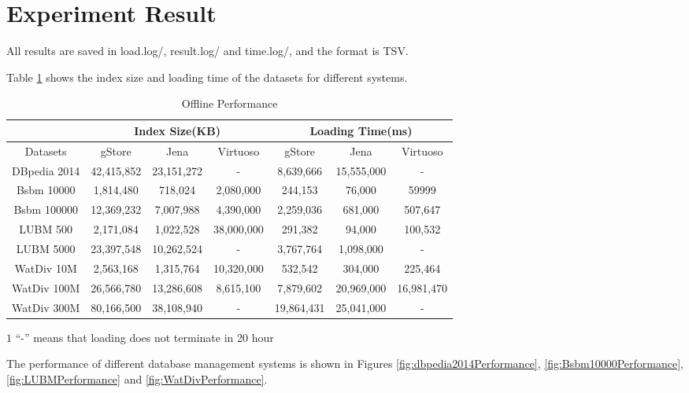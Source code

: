 \documentclass[titlepage, a4paper, 12pt] {article}
\begin{document}
\clearpage

\section{Experiment Result}

All results are saved in load.log/, result.log/ and time.log/, and the format is TSV. 

Table \ref{table:loading} shows the index size and loading time of the datasets
for different systems.

\begin{table}[htcp]
	\small
	\begin{threeparttable}
		\begin{tabular}{|c||c|c|c||c|c|c|}
			\hline
			& \multicolumn{3}{c||}{Index Size(KB)}& \multicolumn{3}{c|}{Loading Time(ms)}\\
			\hline
			\hline
			Datasets & gStore & Jena& Virtuoso& gStore & Jena& Virtuoso\\
			\hline
			DBpedia 2014 & 42,415,852&	23,151,272 &	-\tnote{$1$} & 8,639,666	&15,555,000	& -	\\
			\hline
			Bsbm 10000 & 1,814,480 & 718,024 & 2,080,000 & 244,153 & 76,000 & 59999  \\
			\hline
			Bsbm 100000 & 12,369,232 & 7,007,988 & 4,390,000 & 2,259,036 & 681,000 & 507,647 \\
			\hline
			LUBM 500  &2,171,084 &1,022,528	&	38,000,000 &	291,382&	94,000 &100,532	 \\
			\hline
			LUBM 5000 & 23,397,548&	10,262,524	 &	- & 3,767,764	&1,098,000  &	- \\
			\hline
			WatDiv 10M & 2,563,168&	1,315,764	 &	10,320,000 & 532,542	&304,000	&225,464 \\
			\hline
			WatDiv 100M & 26,566,780&	13,286,608	 &	8,615,100 & 7,879,602	&20,969,000	&16,981,470 \\
			\hline
			WatDiv 300M & 80,166,500&	38,108,940	 &	- & 19,864,431	&25,041,000 &	- \\
			\hline
		\end{tabular}
		\begin{tablenotes}
			\small
		\item[$1$] ``-'' means that loading does not terminate in 20 hour
		\end{tablenotes}
	\end{threeparttable}
	\caption{Offline Performance}
	\label{table:loading}
\end{table}

The performance of different database management systems is shown in Figures \ref{fig:dbpedia2014Performance}, \ref{fig:Bsbm10000Performance}, \ref{fig:LUBMPerformance} and \ref{fig:WatDivPerformance}.
\end{document}

